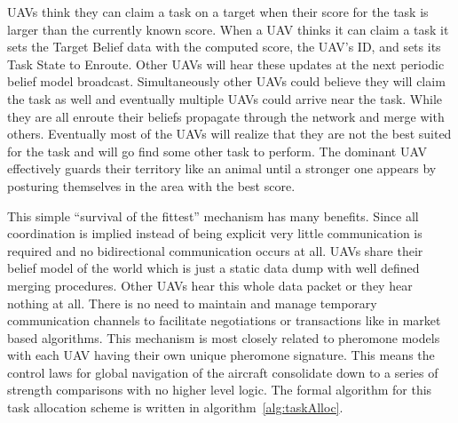 UAVs think they can claim a task on a target when their score for the task is larger than the currently known score.  When a UAV thinks it can claim a task it sets the Target Belief data with the computed score, the UAV's ID, and sets its Task State to Enroute.  Other UAVs will hear these updates at the next periodic belief model broadcast.  Simultaneously other UAVs could believe they will claim the task as well and eventually multiple UAVs could arrive near the task.  While they are all enroute their beliefs propagate through the network and merge with others.  Eventually most of the UAVs will realize that they are not the best suited for the task and will go find some other task to perform.  The dominant UAV effectively guards their territory like an animal until a stronger one appears by posturing themselves in the area with the best score.

This simple ``survival of the fittest'' mechanism has many benefits.  Since all coordination is implied instead of being explicit very little communication is required and no bidirectional communication occurs at all.  UAVs share their belief model of the world which is just a static data dump with well defined merging procedures.  Other UAVs hear this whole data packet or they hear nothing at all.  There is no need to maintain and manage temporary communication channels to facilitate negotiations or transactions like in market based algorithms.  This mechanism is most closely related to pheromone models with each UAV having their own unique pheromone signature.  This means the control laws for global navigation of the aircraft consolidate down to a series of strength comparisons with no higher level logic.  The formal algorithm for this task allocation scheme is written in algorithm~\ref{alg:taskAlloc}.

